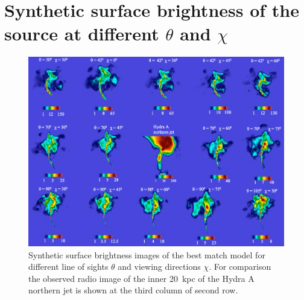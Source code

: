 \documentclass[useAMS, usenatbib]{mn2e}
\begin{document}
\section{Synthetic surface brightness of the source at different $\theta$ and $\chi$}\label{A:morph}
\begin{figure}
\centering
\includegraphics[width=\textwidth]{fig10.eps}
\caption{ Synthetic surface brightness images of the best match model for different line of sights $\theta$ and viewing directions $\chi$. For comparison the observed radio image of the inner 20~kpc of the Hydra A northern jet is shown at the third column of second row. }
\label{f:morph}
\end{figure}
%
%
%
%
\end{document}
